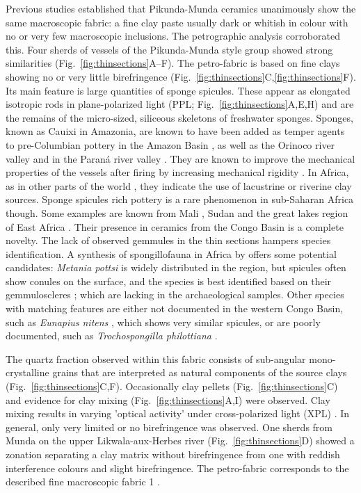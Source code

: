 \documentclass[smallextended,natbib]{svjour3}       %
\begin{document}
Previous studies \citet[60--69]{Seidensticker.2021e} established that Pikunda-Munda ceramics unanimously show the same macroscopic fabric: a fine clay paste usually dark or whitish in colour with no or very few macroscopic inclusions. The petrographic analysis corroborated this. Four sherds of vessels of the Pikunda-Munda style group showed strong similarities (Fig.~\ref{fig:thinsections}A--F). The petro-fabric is based on fine clays showing no or very little birefringence (Fig.~\ref{fig:thinsections}C,\ref{fig:thinsections}F). Its main feature is large quantities of sponge spicules. These appear as elongated isotropic rods in plane-polarized light (PPL; Fig.~\ref{fig:thinsections}A,E,H) and are the remains of the micro-sized, siliceous skeletons of freshwater sponges. Sponges, known as Cauixi in Amazonia, are known to have been added as temper agents to pre-Columbian pottery in the Amazon Basin \citep{Linne.1932,Linne.1957,Costa.2004,Rodrigues.2017,Villagran.2022}, as well as the Orinoco river valley \citep{LozadaMendieta.2019} and in the Paraná river valley \citep{Ottalagano.2016}. They are known to improve the mechanical properties of the vessels after firing by increasing mechanical rigidity \citep{Natalio.2015}. In Africa, as in other parts of the world \citep{Cordell.1993,Bloch.2019}, they indicate the use of lacustrine or riverine clay sources. Sponge spicules rich pottery is a rare phenomenon in sub-Saharan Africa though. Some examples are known from Mali \citep{Brissaud.1986,Mcintosh.1989,Nixon.2017}, Sudan \citep{Adamson.1987} and the great lakes region of East Africa \citep[185]{Ashley.2005}. Their presence in ceramics from the Congo Basin is a complete novelty. The lack of observed gemmules in the thin sections hampers species identification. A synthesis of spongillofauna in Africa by \citet{Manconi.2009} offers some potential candidates: \textit{Metania pottsi} is widely distributed in the region, but spicules often show conules on the surface, and the species is best identified based on their gemmuloscleres \citep[38--47]{Manconi.2009}; which are lacking in the archaeological samples. Other species with matching features are either not documented in the western Congo Basin, such as \textit{Eunapius nitens} \citep[149--151]{Manconi.2009}, which shows very similar spicules, or are poorly documented, such as \textit{Trochospongilla philottiana} \citep[198--199]{Manconi.2009}. 

The quartz fraction observed within this fabric consists of sub-angular mono-crystalline grains that are interpreted as natural components of the source clays (Fig.~\ref{fig:thinsections}C,F). Occasionally clay pellets (Fig.~\ref{fig:thinsections}C) and evidence for clay mixing (Fig.~\ref{fig:thinsections}A,I) were observed. Clay mixing results in varying 'optical activity' under cross-polarized light (XPL) \citep{Whitbread.1986}. In general, only very limited or no birefringence was observed. One sherds from Munda on the upper Likwala-aux-Herbes river (Fig.~\ref{fig:thinsections}D) showed a zonation separating a clay matrix without birefringence from one with reddish interference colours and slight birefringence. The petro-fabric corresponds to the described fine macroscopic fabric 1 \citep[60--69]{Seidensticker.2021e}. 
 
\end{document}
